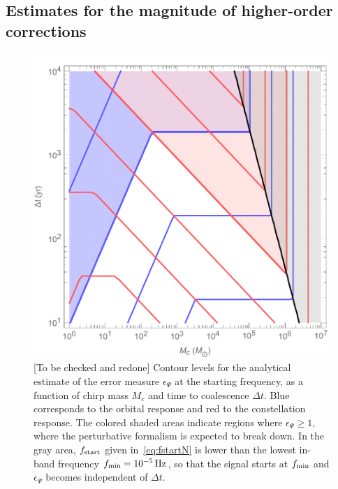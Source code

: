 \documentclass[aps,showpacs,twocolumn,
prd,superscriptaddress,nofootinbib]{revtex4-1}
\newcommand{\Hz}{\,\mathrm{Hz}}
\newcommand{\Mchirp}{M_{c}}
\newcommand{\SM}[1]{{\color{Red} #1}}
\begin{document}

\subsection{Estimates for the magnitude of higher-order corrections}
\label{subsec:lisafom}

\begin{figure}
  \centering
  \includegraphics[width=.9\linewidth]{plots/lisafom_Psi_McDeltat.pdf}
  \caption{\SM{[To be checked and redone]} Contour levels for the analytical estimate of the error measure $\epsilon_{\Psi}$ at the starting frequency, as a function of chirp mass $\Mchirp$ and time to coalescence $\Delta t$. Blue corresponds to the orbital response and red to the constellation response. The colored shaded areas indicate regions where $\epsilon_{\Psi} \geq 1$, where the perturbative formalism is expected to break down. In the gray area, $f_{\rm start}$ given in~\eqref{eq:fstartN} is lower than the lowest in-band frequency $f_{\rm min} = 10^{-5}\Hz$, so that the signal starts at $f_{\rm min}$ and $\epsilon_{\Psi}$ becomes independent of $\Delta t$.}
  \label{fig:lisafomPsiMcDeltat}
\end{figure}
\end{document}
